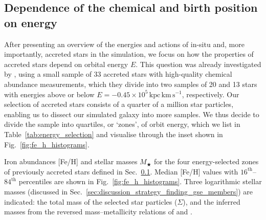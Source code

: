 \documentclass[fleqn,usenatbib]{mnras}
\begin{document}
\subsection{Dependence of the chemical and birth position on energy} \label{sec:analysis_chemodynamic_memory}

After presenting an overview of the energies and actions of in-situ and, more importantly, accreted stars in the simulation, we focus on how the properties of accreted stars depend on orbital energy $E$. This question was already investigated by \citet{Skuladottir2025}, using a small sample of 33 accreted stars with high-quality chemical abundance measurements, which they divide into two samples of 20 and 13 stars with energies above or below $E = -0.45\times10^{5}\,\mathrm{kpc\,km\,s^{-1}}$, respectively. Our selection of accreted stars consists of a quarter of a million star particles, enabling us to dissect our simulated galaxy into more samples. We thus decide to divide the sample into quartiles, or `zones', of orbit energy, which we list in Table~\ref{tab:energy_selection} and visualise through the inset shown in Fig.~\ref{fig:fe_h_histograms}.

\begin{table}
    \centering
    \renewcommand{\arraystretch}{1.25}
    \caption{Iron abundances [Fe/H] and stellar masses $M_\bigstar$ for the four energy-selected zones of previously accreted stars defined in Sec.~\ref{sec:analysis_chemodynamic_memory}. Median [Fe/H] values with $16^\mathrm{th}$–$84^\mathrm{th}$ percentiles are shown in Fig.~\ref{fig:fe_h_histograms}. Three logarithmic stellar masses (discussed in Sec.~\ref{sec:discussion_strategy_finding_gse_members}) are indicated: the total mass of the selected star particles ($\Sigma$), and the inferred masses from the reversed mass–metallicity relations of \citet[][Eq.~\ref{eq:naidu}]{Naidu2022b} and \citet[][Eq.~\ref{eq:kirby}]{Kirby2013}.}
    
    \label{tab:energy_selection}
    \renewcommand{\arraystretch}{1.0}
\end{table}
\end{document}
